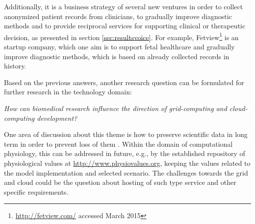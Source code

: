 \begin{itemize}
Additionally, it is a business strategy of several new ventures in order to collect anonymized patient records from clinicians, to gradually improve diagnostic methods and to provide reciprocal services for supporting clinical or therapeutic decision, as presented in section \ref{sec:resultsvoice}. For example,  Fetview\footnote{\url{http://fetview.com/} accessed March 2015} is an startup company, which one aim is to support fetal healthcare and gradually improve diagnostic methods, which is based on already collected records in history.



\end{itemize}


Based on the previous answers, another research question can be formulated for further research in the technology domain: 

\emph{How can biomedical research influence the direction of grid-computing and cloud-computing development?}

One area of discussion about this theme is how to preserve scientific data in long term in order to prevent loss of them \cite{Vines2014,P.BryanHeidorn2008}. Within the domain of computational physiology, this can be addressed in future, e.g., by the established repository of physiological values at \url{http://www.physiovalues.org}, keeping the values related to the model implementation and selected scenario. The challenges towards the grid and cloud could be the question about hosting of such type service and other specific requirements. 

